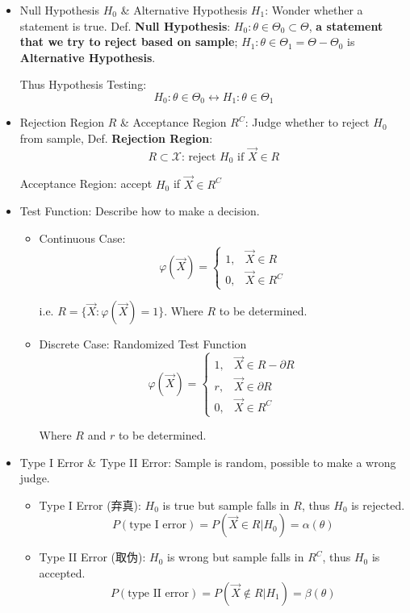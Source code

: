 \documentclass[11pt,a4paper]{ctexart}
\numberwithin{equation}{section}%
\begin{document}
    \begin{itemize}[topsep = -3 pt]
        \item Null Hypothesis $H_0$ \& Alternative Hypothesis $H_1$: Wonder whether a statement is true. Def. \textbf{Null Hypothesis}: $H_0:\theta\in\Theta_0\subset\Theta$, \textbf{a statement that we try to reject based on sample}; $H_1:\theta\in\Theta_1=\Theta-\Theta_0$ is \textbf{Alternative Hypothesis}.
        
        Thus Hypothesis Testing:
        \[
            H_0:\theta\in\Theta_0\longleftrightarrow H_1:\theta\in\Theta_1
        \]
        
        \item Rejection Region $R$ \& Acceptance Region $R^C$: Judge whether to reject $H_0$ from sample, Def. \textbf{Rejection Region}:
        \[R\subset\mathscr{X}\text{: reject } H_0 \text{ if } \vec{X}\in R\]

        Acceptance Region: accept $H_0$ if $\vec{X}\in R^C$
        \item Test Function: Describe how to make a decision.
        \begin{itemize}
            \item Continuous Case:
        \[
            \varphi(\vec{X})=\begin{cases}
                1,&\vec{X}\in R\\
                0,&\vec{X}\in R^C
            \end{cases}
        \]

        i.e. $R=\{\vec{X}:\varphi(\vec{X})=1\}$. Where $R$ to be determined.

        \item Discrete Case: Randomized Test Function
        \[
        \varphi(\vec{X})=\begin{cases}
            1,&\vec{X}\in R-\partial R\\
            r,&\vec{X}\in \partial R\\
            0,&\vec{X}\in R^C
        \end{cases}    
        \]

        Where $R$ and $r$  to be determined.
    \end{itemize}
        \item Type I Error \& Type II Error: Sample is random, possible to make a wrong judge.
            
        \begin{itemize}[topsep = -4 pt]
            \item Type I Error (弃真): $H_0$ is true but sample falls in $R$, thus $H_0$ is rejected.
            \[P(\text{type I error})=P(\vec{X}\in R|H_0)=\alpha(\theta)\]
            \item Type II Error (取伪): $H_0$ is wrong but sample falls in $R^C$, thus $H_0$ is accepted.
            \[P(\text{type II error})=P(\vec{X}\notin R|H_1)=\beta(\theta)\]
        \end{itemize}


\end{itemize}
\end{document}
